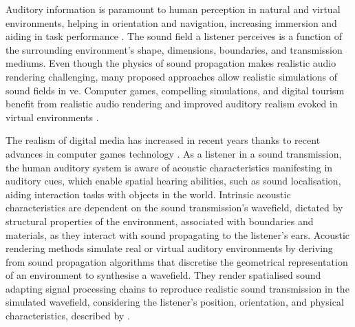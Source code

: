 Auditory information is paramount to human perception in natural and virtual environments, helping in orientation and navigation, increasing immersion and aiding in task performance \citep{lokki2005navigation, bork2015auditory, shivappa2016efficient}. The sound field a listener perceives is a function of the surrounding environment's shape, dimensions, boundaries, and transmission mediums. Even though the physics of sound propagation makes realistic audio rendering challenging, many proposed approaches allow realistic simulations of sound fields in \acrshort{ve}. Computer games, compelling simulations, and digital tourism benefit from realistic audio rendering and improved auditory realism evoked in virtual environments \citep{lokki2002creating, selmanovic2020vr}.\par
The realism of digital media has increased in recent years thanks to recent advances in computer games technology \citep{rubio2017immersive}. As a listener in a sound transmission, the human auditory system is aware of acoustic characteristics manifesting in auditory cues, which enable spatial hearing abilities, such as sound localisation, aiding interaction tasks with objects in the world. Intrinsic acoustic characteristics are dependent on the sound transmission's wavefield, dictated by structural properties of the environment, associated with boundaries and materials, as they interact with sound propagating to the listener's ears. Acoustic rendering methods simulate real or virtual auditory environments by deriving from sound propagation algorithms that discretise the geometrical representation of an environment to synthesise a wavefield. They render spatialised sound adapting signal processing chains to reproduce realistic sound transmission in the simulated wavefield, considering the listener's position, orientation, and physical characteristics, described by  \citep{hulusic2012acoustic}.\par

